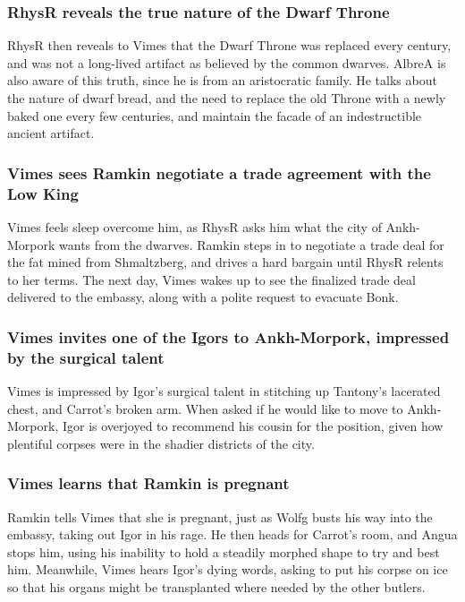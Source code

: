 \subsubsection{\Gls{RhysR} reveals the true nature of the Dwarf Throne}
\Gls{RhysR} then reveals to \Gls{Vimes} that the Dwarf Throne was replaced every century, and was
not a long-lived artifact as believed by the common dwarves. \Gls{AlbreA} is also aware of this
truth, since he is from an aristocratic family. He talks about the nature of dwarf bread, and the
need to replace the old Throne with a newly baked one every few centuries, and maintain the facade
of an indestructible ancient artifact.

\subsubsection{\Gls{Vimes} sees \Gls{Ramkin} negotiate a trade agreement with the Low King}
\Gls{Vimes} feels sleep overcome him, as \Gls{RhysR} asks him what the city of Ankh-Morpork wants
from the dwarves. \Gls{Ramkin} steps in to negotiate a trade deal for the fat mined from
Shmaltzberg, and drives a hard bargain until \Gls{RhysR} relents to her terms. The next day,
\Gls{Vimes} wakes up to see the finalized trade deal delivered to the embassy, along with a polite
request to evacuate Bonk.

\subsubsection{\Gls{Vimes} invites one of the Igors to Ankh-Morpork, impressed by the surgical
    talent}
\Gls{Vimes} is impressed by \Gls{Igor}'s surgical talent in stitching up \Gls{Tantony}'s lacerated
chest, and \Gls{Carrot}'s broken arm. When asked if he would like to move to Ankh-Morpork,
\Gls{Igor} is overjoyed to recommend his cousin for the position, given how plentiful corpses were
in the shadier districts of the city.

\subsubsection{\Gls{Vimes} learns that \Gls{Ramkin} is pregnant}
\Gls{Ramkin} tells \Gls{Vimes} that she is pregnant, just as \Gls{Wolfg} busts his way into the
embassy, taking out \Gls{Igor} in his rage. He then heads for \Gls{Carrot}'s room, and \Gls{Angua}
stops him, using his inability to hold a steadily morphed shape to try and best him. Meanwhile,
\Gls{Vimes} hears \Gls{Igor}'s dying words, asking to put his corpse on ice so that his organs might
be transplanted where needed by the other butlers.

